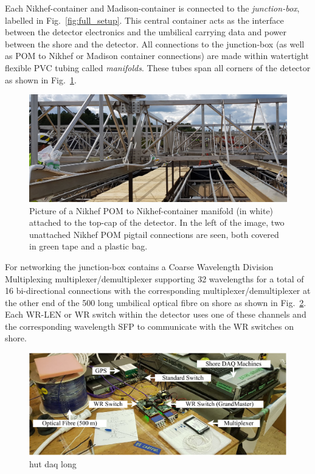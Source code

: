 Each Nikhef-container and Madison-container is connected to the \chipsfive \emph{junction-box},
labelled in Fig.~\ref{fig:full_setup}. This central container acts as the interface between the
detector electronics and the umbilical carrying data and power between the shore and the detector.
All connections to the junction-box (as well as POM to Nikhef or Madison container connections)
are made within watertight flexible PVC tubing called \emph{manifolds}. These tubes span all
corners of the \chipsfive detector as shown in Fig.~\ref{fig:manifold}.

\begin{figure} %
    \includegraphics[width=\textwidth]{diagrams/5-daq/manifold.jpg}
    \caption[manifold short]
    {Picture of a Nikhef POM to Nikhef-container manifold (in white) attached to the top-cap of
        the \chipsfive detector. In the left of the image, two unattached Nikhef POM pigtail
        connections are seen, both covered in green tape and a plastic bag.}
    \label{fig:manifold}
\end{figure}

For networking the junction-box contains a Coarse Wavelength Division Multiplexing
multiplexer/demultiplexer supporting 32 wavelengths for a total of 16 bi-directional connections
with the corresponding multiplexer/demultiplexer at the other end of the \unit{500}{}
long umbilical optical fibre on shore as shown in Fig.~\ref{fig:hut_daq}. Each WR-LEN or WR switch
within the detector uses one of these channels and the corresponding wavelength SFP to communicate
with the WR switches on shore.

\begin{figure} %
    \includegraphics[width=\textwidth]{diagrams/5-daq/hut_daq.pdf}
    \caption[hut daq short]
    {hut daq long}
    \label{fig:hut_daq}
\end{figure}

